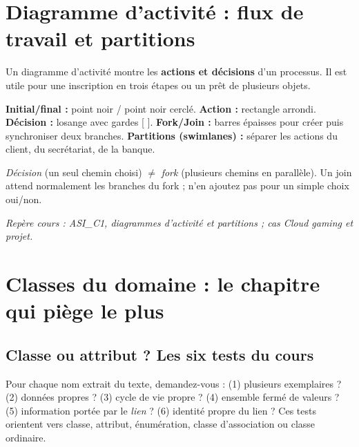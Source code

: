 \documentclass[10pt,a4paper]{article}
\newcommand{\source}[1]{\par{\footnotesize\color{bodygray}\textit{Repère cours : #1}}}
\begin{document}
\section{Diagramme d'activité : flux de travail et partitions}
Un diagramme d'activité montre les \textbf{actions et décisions} d'un processus. Il est utile pour une inscription en trois étapes ou un prêt de plusieurs objets.
\begin{center}
\end{center}
\textbf{Initial/final :} point noir / point noir cerclé. \textbf{Action :} rectangle arrondi. \textbf{Décision :} losange avec gardes [ ]. \textbf{Fork/Join :} barres épaisses pour créer puis synchroniser deux branches. \textbf{Partitions (swimlanes) :} séparer les actions du client, du secrétariat, de la banque.
\begin{warningbox}
\emph{Décision} (un seul chemin choisi) \(\neq\) \emph{fork} (plusieurs chemins en parallèle). Un join attend normalement les branches du fork ; n'en ajoutez pas pour un simple choix oui/non.
\end{warningbox}
\source{ASI\_C1, diagrammes d'activité et partitions ; cas Cloud gaming et projet.}

\section{Classes du domaine : le chapitre qui piège le plus}
\subsection{Classe ou attribut ? Les six tests du cours}
Pour chaque nom extrait du texte, demandez-vous : (1) plusieurs exemplaires ? (2) données propres ? (3) cycle de vie propre ? (4) ensemble fermé de valeurs ? (5) information portée par le \emph{lien} ? (6) identité propre du lien ? Ces tests orientent vers classe, attribut, énumération, classe d'association ou classe ordinaire.
\end{document}
